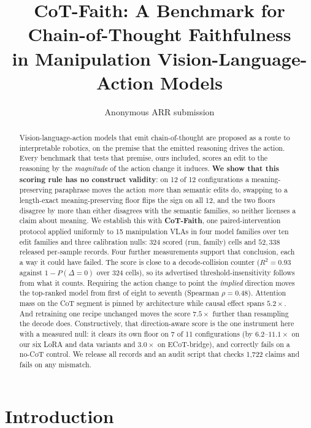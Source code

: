 \documentclass[11pt]{article}
\title{CoT-Faith: A Benchmark for Chain-of-Thought Faithfulness\\
in Manipulation Vision-Language-Action Models}
\author{Anonymous ARR submission}
\begin{document}
\maketitle

\begin{abstract}
Vision-language-action models that emit chain-of-thought are proposed as a route to interpretable robotics, on the premise that the emitted reasoning drives the action. Every benchmark that tests that premise, ours included, scores an edit to the reasoning by the \emph{magnitude} of the action change it induces. \textbf{We show that this scoring rule has no construct validity}: on 12 of 12 configurations a meaning-preserving paraphrase moves the action \emph{more} than semantic edits do, swapping to a length-exact meaning-preserving floor flips the sign on all 12, and the two floors disagree by more than either disagrees with the semantic families, so neither licenses a claim about meaning. We establish this with \textbf{CoT-Faith}, one paired-intervention protocol applied uniformly to 15 manipulation VLAs in four model families over ten edit families and three calibration nulls: 324 scored (run, family) cells and $52{,}338$ released per-sample records. Four further measurements support that conclusion, each a way it could have failed. The score is close to a decode-collision counter ($R^2{=}0.93$ against $1 - P(\Delta{=}0)$ over 324 cells), so its advertised threshold-insensitivity follows from what it counts. Requiring the action change to point the \emph{implied} direction moves the top-ranked model from first of eight to seventh (Spearman $\rho = 0.48$). Attention mass on the CoT segment is pinned by architecture while causal effect spans $5.2\times$. And retraining one recipe unchanged moves the score $7.5\times$ further than resampling the decode does. Constructively, that direction-aware score is the one instrument here with a measured null: it clears its own floor on 7 of 11 configurations (by $6.2$--$11.1\times$ on our six LoRA and data variants and $3.0\times$ on ECoT-bridge), and correctly fails on a no-CoT control. We release all records and an audit script that checks 1,722 claims and fails on any mismatch.
\end{abstract}

\section{Introduction}
\label{sec:intro}
\end{document}
